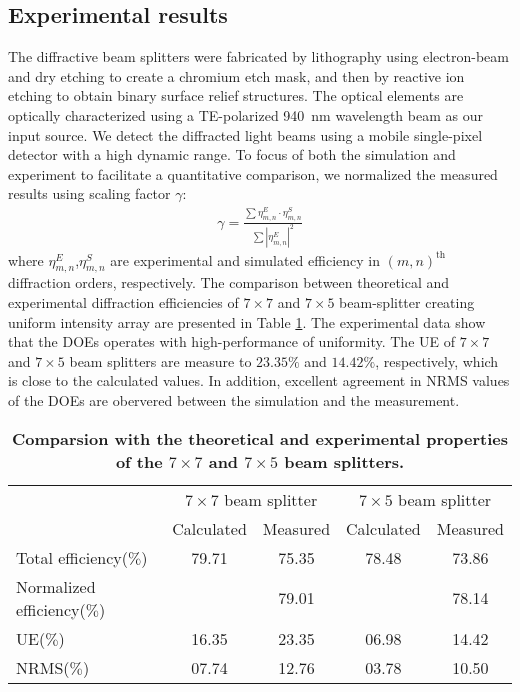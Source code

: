 \subsection{Experimental results}
The diffractive beam splitters were fabricated by lithography using electron-beam and dry etching to create a chromium etch mask, and then by reactive ion etching to obtain  binary surface relief structures.
The optical elements are optically characterized using a TE-polarized \SI{940}{\nano \metre} wavelength beam as our input source.
We detect the diffracted light beams using a mobile single-pixel detector with a high dynamic range.
To focus of both the simulation and experiment to facilitate a quantitative comparison, we normalized the measured results using scaling factor $\gamma$:
\begin{align}\label{eq:normalization}
\gamma = \frac{\sum \eta_{m,n}^{E} \cdot \eta_{m,n}^{S}}{\sum \left|\eta_{m,n}^{E}\right|^2} 
\end{align}
where $\eta_{m,n}^{E}$,$\eta_{m,n}^{S}$ are experimental and simulated efficiency in $(m,n)^\text{th}$ diffraction orders, respectively.
The comparison between theoretical and experimental diffraction efficiencies of $7\times7$ and $7\times5$ beam-splitter creating uniform intensity array are presented in Table \ref{tab:results_uniform}.
The experimental data show that the DOEs operates with high-performance of uniformity.
The UE of $7\times7$ and $7\times5$ beam splitters are measure to $23.35 \%$ and $14.42 \%$, respectively, which is close to the calculated values.
In addition, excellent agreement in NRMS values of the DOEs are obervered between the simulation and the measurement.
\begin{table}[htbp]
\centering
\caption{\bf Comparsion with the theoretical and experimental properties of the $7\times7$ and $7\times5$ beam splitters.}
\begin{tabular}{lcccc} 
\hline
{}&\multicolumn{2}{c}{$7\times7$ beam splitter}&\multicolumn{2}{c}{$7\times5$ beam splitter}\\
{} & Calculated & Measured & Calculated & Measured\\
\hline
Total efficiency($\%$) & 79.71  & 75.35 & 78.48  & 73.86   \\
Normalized efficiency($\%$)& {}  & 79.01 & {}  & 78.14 \\   
UE($\%$) & 16.35 & 23.35& 06.98 & 14.42    \\
NRMS($\%$) & 07.74 & 12.76 & 03.78 & 10.50 \\
\hline
\end{tabular}
  \label{tab:results_uniform}
\end{table}

